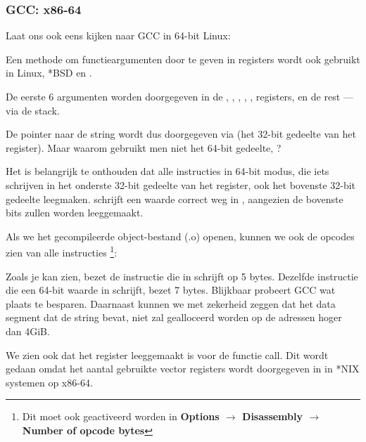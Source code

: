 \subsubsection{GCC: x86-64}

Laat ons ook eens kijken naar GCC in 64-bit Linux:



Een methode om functieargumenten door te geven in registers wordt ook gebruikt in Linux, *BSD en \MacOSX \SysVABI.

De eerste 6 argumenten worden doorgegeven in de \RDI, \RSI, \RDX, \RCX, ,  registers, en de rest --- via de stack.

De pointer naar de string wordt dus doorgegeven via \EDI (het 32-bit gedeelte van het register).
Maar waarom gebruikt men niet het 64-bit gedeelte, \RDI?

Het is belangrijk te onthouden dat alle \MOV instructies in 64-bit modus, die iets schrijven in het onderste 32-bit gedeelte van het register, ook het bovenste 32-bit gedeelte leegmaken.
 schrijft een waarde correct weg in \RAX, aangezien de bovenste bits zullen worden leeggemaakt.

Als we het gecompileerde object-bestand (.o) openen, kunnen we ook de opcodes zien van alle instructies
\footnote{Dit moet ook geactiveerd worden in \textbf{Options $\rightarrow$ Disassembly $\rightarrow$ Number of opcode bytes}}:



\label{hw_EDI_instead_of_RDI}
Zoals je kan zien, bezet de instructie die in \EDI schrijft op  5 bytes.
Dezelfde instructie die een 64-bit waarde in \RDI schrijft, bezet 7 bytes.
Blijkbaar probeert GCC wat plaats te besparen.
Daarnaast kunnen we met zekerheid zeggen dat het data segment dat de string bevat, niet zal gealloceerd worden op de adressen hoger dan 4\gls{GiB}.

\label{SysVABI_input_EAX}
We zien ook dat het \EAX register leeggemaakt is voor de \printf functie call.
Dit wordt gedaan omdat het aantal gebruikte vector registers wordt doorgegeven in \EAX in *NIX systemen op x86-64.


